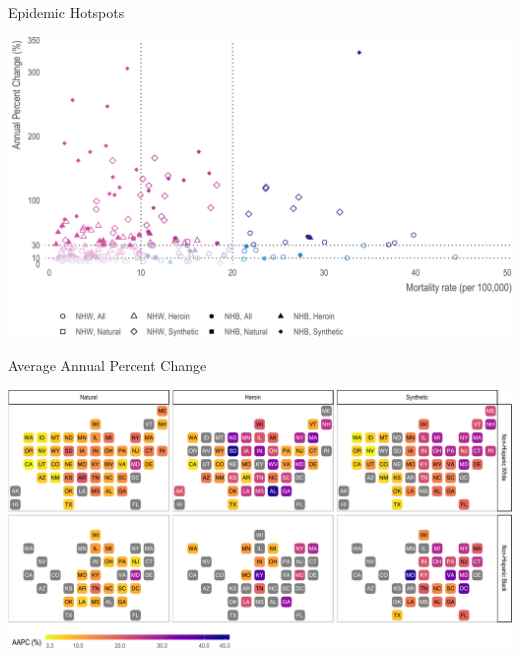 \documentclass[ignorenonframetext,compress]{beamer}
\begin{document}
\begin{frame}{Epidemic Hotspots}

\includegraphics{epc_slides_files/figure-beamer/unnamed-chunk-11-1.pdf}

\end{frame}

\begin{frame}{Average Annual Percent Change}

\includegraphics{epc_slides_files/figure-beamer/unnamed-chunk-12-1.pdf}

\end{frame}
\end{document}
